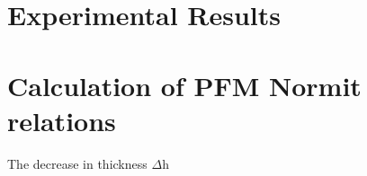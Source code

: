 \documentclass{article}
\begin{document}
\section{Experimental Results}
\section{Calculation of PFM Normit relations}
The decrease in thickness $\Delta$h



\end{document}
